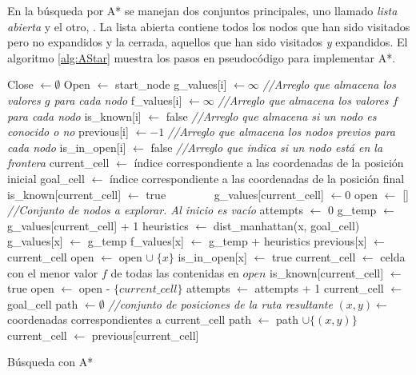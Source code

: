 \documentclass[letterpaper,12pt]{article}
\begin{document}
En la búsqueda por A* se manejan dos conjuntos principales, uno llamado \textit{lista abierta} y el otro, . La lista abierta contiene todos los nodos que han sido visitados pero no expandidos y la cerrada, aquellos que han sido visitados \textit{y} expandidos. El algoritmo \ref{alg:AStar} muestra los pasos en pseudocódigo para implementar A*. 
\begin{algorithm}
\DontPrintSemicolon
{}
Close $\leftarrow \emptyset$
Open $\leftarrow$ start_node
\ForAll{ $i \in [0, map\_size)$}
{
  g\_values[i] $\leftarrow \infty$ \textit{//Arreglo que almacena los valores $g$ para cada nodo}\;
  f\_values[i] $\leftarrow \infty$ \textit{//Arreglo que almacena los valores $f$ para cada nodo}\;
  is\_known[i] $\leftarrow$ false \textit{//Arreglo que almacena si un nodo es conocido o no}\;
  previous[i] $\leftarrow -1$  \textit{//Arreglo que almacena los nodos previos para cada nodo}
  is\_in\_open[i] $\leftarrow$ false \textit{//Arreglo que indica si un nodo está en la frontera}\;
}
current\_cell $\leftarrow$ índice correspondiente a las coordenadas de la posición inicial\;
goal\_cell $\leftarrow$ índice correspondiente a las coordenadas de la posición final\;
is\_known[current\_cell] $\leftarrow$ true $\qquad\qquad$g\_values[current\_cell] $\leftarrow 0$\;
open $\leftarrow$ [] \textit{//Conjunto de nodos a explorar. Al inicio es vacío}\; 
attempts $\leftarrow$ 0\;
{
  {
    g\_temp $\leftarrow$ g\_values[current\_cell] + 1\;
    heuristics $\leftarrow$ dist\_manhattan(x, goal\_cell)\; 
    {
      g\_values[x] $\leftarrow$ g\_temp\;
      f\_values[x] $\leftarrow$ g\_temp + heuristics\;
      previous[x] $\leftarrow$ current\_cell\;
    }
    {
      open $\leftarrow$ open $\cup\; \{x\}$
    }
    is\_in\_open[x] $\leftarrow$ true
  }
  current\_cell $\leftarrow$ celda con el menor valor $f$ de todas las contenidas en $open$\;
  is\_known[current\_cell] $\leftarrow$ true\;
  open $\leftarrow$ open - $\{current\_cell\}$\;
  attempts $\leftarrow$ attempts + 1\;
}
current\_cell $\leftarrow$ goal\_cell\;
path $\leftarrow\emptyset$ \textit{//conjunto de posiciones de la ruta resultante}\;
{
  $(x,y)\leftarrow$ coordenadas correspondientes a current\_cell\;
  path $\leftarrow$ path $\cup  \{(x,y)\}$\;
  current\_cell $\leftarrow$ previous[current\_cell]\;
}
\caption{Búsqueda con A*}
\label{alg:AStar}
\end{algorithm}
\end{document}
